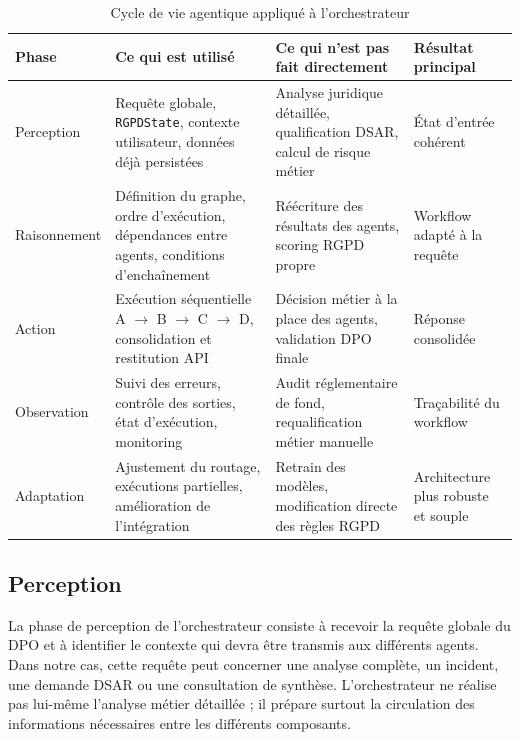 \documentclass[12pt,a4paper]{report}
\begin{document}
\begin{table}[H]
\centering
\caption{Cycle de vie agentique appliqué à l'orchestrateur}
\label{tab:cycle_orchestrateur}
\begin{tabularx}{\textwidth}{|p{2.2cm}|X|X|X|}
\hline
\textbf{Phase} & \textbf{Ce qui est utilisé} & \textbf{Ce qui n'est pas fait directement} & \textbf{Résultat principal} \\
\hline
Perception & Requête globale, \texttt{RGPDState}, contexte utilisateur, données déjà persistées & Analyse juridique détaillée, qualification DSAR, calcul de risque métier & État d'entrée cohérent \\
\hline
Raisonnement & Définition du graphe, ordre d'exécution, dépendances entre agents, conditions d'enchaînement & Réécriture des résultats des agents, scoring RGPD propre & Workflow adapté à la requête \\
\hline
Action & Exécution séquentielle A $\rightarrow$ B $\rightarrow$ C $\rightarrow$ D, consolidation et restitution API & Décision métier à la place des agents, validation DPO finale & Réponse consolidée \\
\hline
Observation & Suivi des erreurs, contrôle des sorties, état d'exécution, monitoring & Audit réglementaire de fond, requalification métier manuelle & Traçabilité du workflow \\
\hline
Adaptation & Ajustement du routage, exécutions partielles, amélioration de l'intégration & Retrain des modèles, modification directe des règles RGPD & Architecture plus robuste et souple \\
\hline
\end{tabularx}
\end{table}

\subsection{Perception}

La phase de perception de l'orchestrateur consiste à recevoir la requête globale du DPO et à identifier le contexte qui devra être transmis aux différents agents. Dans notre cas, cette requête peut concerner une analyse complète, un incident, une demande DSAR ou une consultation de synthèse. L'orchestrateur ne réalise pas lui-même l'analyse métier détaillée ; il prépare surtout la circulation des informations nécessaires entre les différents composants.
\end{document}
